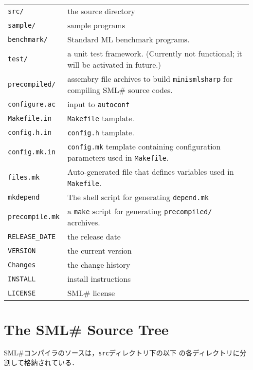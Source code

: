 \documentclass{jbook}
\newcommand{\txt}[2]{#2}
\newcommand{\smlsharp}{SML\#}
\newcommand{\code}[1]{\mbox{\large\tt #1}}
\begin{document}
\begin{tabular}{ll}
\code{src/} & the source directory
\\
\code{sample/} & sample programs
\\
\code{benchmark/} & Standard ML benchmark programs.
\\
\code{test/} & a unit test framework. (Currently not functional; it will
be activated in future.)
\\
\code{precompiled/} & assembry file archives to build
\code{minismlsharp} for compiling \smlsharp{} source codes.
\\
\code{configure.ac} & input to \code{autoconf}
\\
\code{Makefile.in} & \code{Makefile} tamplate.
\\
\code{config.h.in} & \code{config.h} tamplate.
\\
\code{config.mk.in} &
	\code{config.mk} template containing configuration parameters used in \code{Makefile}.
\\
\code{files.mk} & Auto-generated file that defines variables used in
\code{Makefile}.
\\
\code{mkdepend} & The shell script for generating \code{depend.mk}
\\
\code{precompile.mk} & a \code{make} script for generating
    \code{precompiled/} acrchives.
\\
\code{RELEASE\_DATE} & the release date
\\
\code{VERSION} &  the current version
\\
\code{Changes} &  the change history
\\
\code{INSTALL} & install instructions
\\
\code{LICENSE} & \smlsharp{} license
\end{tabular}
\fi%

\section{\txt
{\smlsharp{} ソースツリー}
{The \smlsharp{} Source Tree}
}

\ifjp%
	\smlsharp{}コンパイラのソースは，\code{src}ディレクトリ下の以下
の各ディレクトリに分割して格納されている．
\end{document}

